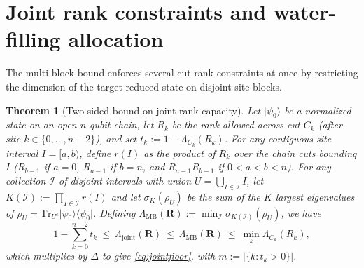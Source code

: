 \documentclass[reprint,aps,pra,floatfix,superscriptaddress,nofootinbib,longbibliography]{revtex4-2}
\newtheorem{theorem}{Theorem}
\theoremstyle{remark}
\theoremstyle{definition}
\newcommand{\ket}[1]{\lvert #1 \rangle}
\newcommand{\bra}[1]{\langle #1 \rvert}
\newcommand{\Tr}{\mathrm{Tr}}
\begin{document}
\section{Joint rank constraints and water-filling allocation}
\label{app:joint}

The multi-block bound enforces several cut-rank constraints at once by
restricting the dimension of the target reduced state on disjoint site blocks.

\begin{theorem}[Two-sided bound on joint rank capacity]
\label{thm:joint}
Let $\ket{\psi_0}$ be a normalized state on an open $n$-qubit chain, let $R_k$
be the rank allowed across cut $C_k$ (after site $k\in\{0,\dots,n-2\}$), and set
$t_k:=1-\Lambda_{C_k}(R_k)$. For any contiguous site interval $I=[a,b)$, define
$r(I)$ as the product of $R_k$ over the chain cuts bounding $I$ ($R_{b-1}$ if
$a=0$, $R_{a-1}$ if $b=n$, and $R_{a-1}R_{b-1}$ if $0<a<b<n$). For any
collection $\mathcal{I}$ of disjoint intervals with union $U=\bigcup_{I\in\mathcal{I}}I$,
let $K(\mathcal{I}):=\prod_{I\in\mathcal{I}}r(I)$ and let $\sigma_K(\rho_U)$ be
the sum of the $K$ largest eigenvalues of $\rho_U=\Tr_{U^c}\ket{\psi_0}\bra{\psi_0}$.
Defining $\Lambda_{\mathrm{MB}}(\mathbf{R}):=\min_{\mathcal{I}}\sigma_{K(\mathcal{I})}(\rho_U)$,
we have
\begin{equation}
  \label{eq:jointthm}
  1-\sum_{k=0}^{n-2}t_k\ \le\ \Lambda_{\mathrm{joint}}(\mathbf{R})
  \ \le\ \Lambda_{\mathrm{MB}}(\mathbf{R})
  \ \le\ \min_k\Lambda_{C_k}(R_k),
\end{equation}
which multiplies by $\Delta$ to give \eqref{eq:jointfloor}, with $m:=|\{k:t_k>0\}|$.
\end{theorem}
\end{document}
